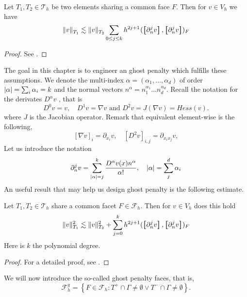 \begin{lemma}
    Let $T_{1},T_{2 } \in  \mathcal{T} _{h}$ be two elements sharing a common face $F$. Then for $v \in V_{h}$  we have \[
    \| v \|_{ T_{1} }^{  }  \lesssim \| v \|_{ T_{2} }^{  } \sum_{0\le j\le k}  {h^{2j +1}}^{} ( \jump{ \partial _{n}^{j} v }, \jump{ \partial ^{j}_{n} v }    )_{F}
    \]

\end{lemma}
\begin{proof}
    See \cite[Lemma 2.19]{gurkan2019stabilized}.
\end{proof}
The goal in this chapter is to engineer an ghost penalty which fulfills these assumptions.
We denote the multi-index $\alpha  = ( \alpha _{1}, \ldots, \alpha _{d})  $ of order $\left\lvert  \alpha   \right\rvert = \sum_{i}^{}  \alpha _{i} = k $   and the normal vectors $n^{\alpha } = n_{1}^{\alpha _{1}} \ldots n_{d}^{\alpha _{d}}$.
Recall the notation for the derivates $D^{\alpha } v$ , that is \[
D ^{0} v  = v, \quad   D ^{1}v  = \nabla v \text{ and }  D ^{2} v  = J(\nabla v) = Hess(v).
\]
where $J$ is the Jacobian operator. Remark that equivalent element-wise is the following, \[
\left[ \nabla v \right] _{i} = \partial_{x_{i}} v, \quad  \left[ D^2 v \right] _{i,j} = \partial_{x_{i}x_{j}} v,
\]
Let us introduce the notation \[
\partial _{n}^{j} v = \sum_{\left\lvert  \alpha   \right\rvert =j }^{k} \frac{D ^{\alpha }v( x) n^{\alpha }}{\alpha !}, \quad \left\lvert  \alpha   \right\rvert = \sum_{j}^{d} \alpha_{i}
\]
An useful result that may help us design ghost penalty is the following estimate.

\begin{lemma}
    \label{lemma:local_facet_estimate}
    Let $T_{1}, T_{2} \in  \mathcal{T} _{h} $ share a common facet $F \in \mathcal{F}_{h} $. Then for $v_{} \in  V_{h}$  does this hold \[
    \| v \|_{ T_{1} }^{  2}  \lesssim  \| v \|_{ T_{2} }^{2  }  + \sum_{j=0}^{k}  h^{2j +1} ( \jump{ \partial _{n}^{j} v}, \jump{ \partial _{n}^{j} v}    )_{F}
    \]
        Here is $k$ the polynomial degree.
\end{lemma}

\begin{proof}
    For a detailed proof, see \cite{gurkan2019stabilized}.
\end{proof}

We will now introduce the so-called ghost penalty faces, that is, \[
\mathcal{F} ^{g}_{h} = \left\{ F\in \mathcal{F} _{h} : T^{+}\cap \Gamma \neq \emptyset  \vee T^{-}\cap \Gamma \neq \emptyset  \right\}.
\]

